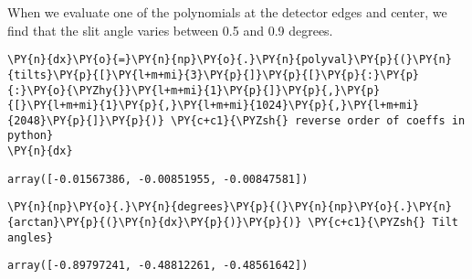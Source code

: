     When we evaluate one of the polynomials at the detector edges and
center, we find that the slit angle varies between 0.5 and 0.9 degrees.

    \begin{tcolorbox}[breakable, size=fbox, boxrule=1pt, pad at break*=1mm,colback=cellbackground, colframe=cellborder]
\begin{Verbatim}[commandchars=\\\{\}]
\PY{n}{dx}\PY{o}{=}\PY{n}{np}\PY{o}{.}\PY{n}{polyval}\PY{p}{(}\PY{n}{tilts}\PY{p}{[}\PY{l+m+mi}{3}\PY{p}{]}\PY{p}{[}\PY{p}{:}\PY{p}{:}\PY{o}{\PYZhy{}}\PY{l+m+mi}{1}\PY{p}{]}\PY{p}{,}\PY{p}{[}\PY{l+m+mi}{1}\PY{p}{,}\PY{l+m+mi}{1024}\PY{p}{,}\PY{l+m+mi}{2048}\PY{p}{]}\PY{p}{)} \PY{c+c1}{\PYZsh{} reverse order of coeffs in python}
\PY{n}{dx}
\end{Verbatim}
\end{tcolorbox}

            \begin{tcolorbox}[breakable, size=fbox, boxrule=.5pt, pad at break*=1mm, opacityfill=0]
\begin{Verbatim}[commandchars=\\\{\}]
array([-0.01567386, -0.00851955, -0.00847581])
\end{Verbatim}
\end{tcolorbox}
        
    \begin{tcolorbox}[breakable, size=fbox, boxrule=1pt, pad at break*=1mm,colback=cellbackground, colframe=cellborder]
\begin{Verbatim}[commandchars=\\\{\}]
\PY{n}{np}\PY{o}{.}\PY{n}{degrees}\PY{p}{(}\PY{n}{np}\PY{o}{.}\PY{n}{arctan}\PY{p}{(}\PY{n}{dx}\PY{p}{)}\PY{p}{)} \PY{c+c1}{\PYZsh{} Tilt angles}
\end{Verbatim}
\end{tcolorbox}

            \begin{tcolorbox}[breakable, size=fbox, boxrule=.5pt, pad at break*=1mm, opacityfill=0]
\begin{Verbatim}[commandchars=\\\{\}]
array([-0.89797241, -0.48812261, -0.48561642])
\end{Verbatim}
\end{tcolorbox}
        
